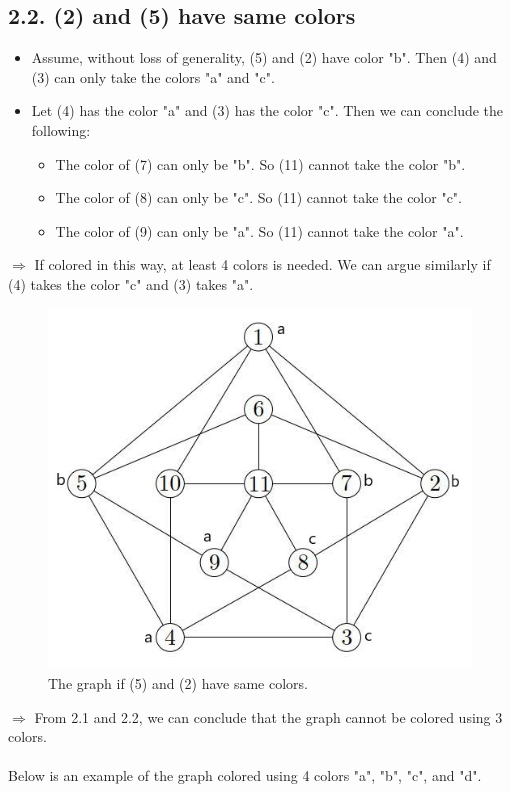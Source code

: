 \documentclass{article}
\begin{document}
\subsection*{2.2. (2) and (5) have same colors}
\begin{itemize}
    \item Assume, without loss of generality, (5) and (2) have color "b". Then (4) and (3) can only take the colors "a" and "c".
    \item Let (4) has the color "a" and (3) has the color "c". Then we can conclude the following:
    \begin{itemize}
        \item The color of (7) can only be "b". So (11) cannot take the color "b".
        \item The color of (8) can only be "c". So (11) cannot take the color "c".
        \item The color of (9) can only be "a". So (11) cannot take the color "a".
    \end{itemize}
\end{itemize}
$\Rightarrow$ If colored in this way, at least 4 colors is needed. We can argue similarly if (4) takes the color "c" and (3) takes "a".

\begin{figure}[h]
    \includegraphics[scale = 0.53]{2.2}
    \centering
    \caption{The graph if (5) and (2) have same colors.}
\end{figure}

$\Longrightarrow$ From 2.1 and 2.2, we can conclude that the graph cannot be colored using 3 colors. \\\\
Below is an example of the graph colored using 4 colors "a", "b", "c", and "d".
\end{document}
